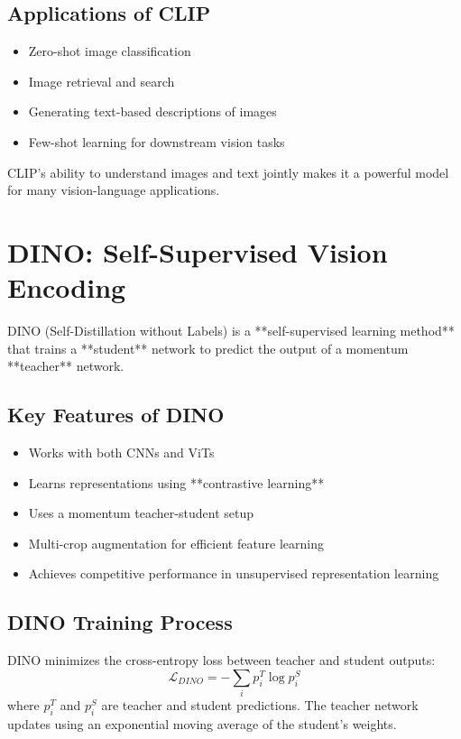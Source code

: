 \documentclass[
]{book}
\begin{document}
\section{Applications of CLIP}\label{applications-of-clip-1}

\begin{itemize}
\item
  Zero-shot image classification
\item
  Image retrieval and search
\item
  Generating text-based descriptions of images
\item
  Few-shot learning for downstream vision tasks
\end{itemize}

CLIP's ability to understand images and text jointly makes it a powerful
model for many vision-language applications.

\chapter{DINO: Self-Supervised Vision Encoding}\label{dino-self-supervised-vision-encoding-1}

DINO (Self-Distillation without Labels) is a **self-supervised
learning method** that trains a **student** network to predict the
output of a momentum **teacher** network.

\section{Key Features of DINO}\label{key-features-of-dino-1}

\begin{itemize}
\item
  Works with both CNNs and ViTs
\item
  Learns representations using **contrastive learning**
\item
  Uses a momentum teacher-student setup
\item
  Multi-crop augmentation for efficient feature learning
\item
  Achieves competitive performance in unsupervised representation
  learning
\end{itemize}

\section{DINO Training Process}\label{dino-training-process-1}

DINO minimizes the cross-entropy loss between teacher and student
outputs: \[\mathcal{L}_{DINO} = - \sum_{i} p_i^T \log p_i^S\] where
\(p_i^T\) and \(p_i^S\) are teacher and student predictions. The teacher
network updates using an exponential moving average of the student's
weights.
\end{document}
